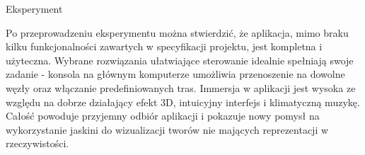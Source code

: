 \begin{chapter}{Eksperyment}


Po przeprowadzeniu eksperymentu można stwierdzić, że aplikacja, mimo braku kilku funkcjonalności zawartych w specyfikacji projektu, jest kompletna i użyteczna. Wybrane rozwiązania ułatwiające sterowanie idealnie spełniają swoje zadanie - konsola na głównym komputerze umożliwia przenoszenie na dowolne węzły oraz włączanie predefiniowanych tras. Immersja w aplikacji jest wysoka ze względu na dobrze działający efekt 3D, intuicyjny interfejs i klimatyczną muzykę. Całość powoduje przyjemny odbiór aplikacji i pokazuje nowy pomysł na wykorzystanie jaskini do wizualizacji tworów nie mających reprezentacji w rzeczywistości. 

\end{chapter}
